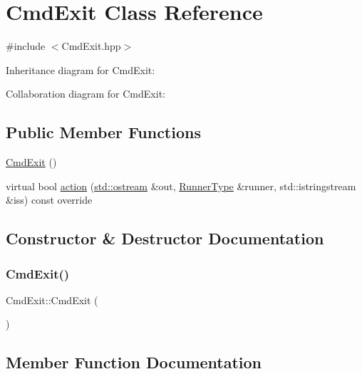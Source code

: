 \hypertarget{classCmdExit}{}\section{Cmd\+Exit Class Reference}
\label{classCmdExit}


{\ttfamily \#include $<$Cmd\+Exit.\+hpp$>$}



Inheritance diagram for Cmd\+Exit\+:


Collaboration diagram for Cmd\+Exit\+:
\subsection*{Public Member Functions}
\begin{DoxyCompactItemize}
\item 
\hyperlink{classCmdExit_ac4d01ff5e1b7de1ad4b54c2313da053c}{Cmd\+Exit} ()
\item 
virtual bool \hyperlink{classCmdExit_a51706475cf423b184855ba45fd7fa1a7}{action} (\hyperlink{doctest_8h_a116af65cb5e924b33ad9d9ecd7a783f3}{std\+::ostream} \&out, \hyperlink{Command_8hpp_ad45c3de597c2023a8be0399d914161f4}{Runner\+Type} \&runner, std\+::istringstream \&iss) const override
\end{DoxyCompactItemize}


\subsection{Constructor \& Destructor Documentation}
\mbox{\label{classCmdExit_ac4d01ff5e1b7de1ad4b54c2313da053c}} 
\subsubsection{\texorpdfstring{Cmd\+Exit()}{CmdExit()}}
{\footnotesize\ttfamily Cmd\+Exit\+::\+Cmd\+Exit (\begin{DoxyParamCaption}{ }\end{DoxyParamCaption})}



\subsection{Member Function Documentation}
\mbox{\label{classCmdExit_a51706475cf423b184855ba45fd7fa1a7}} 
